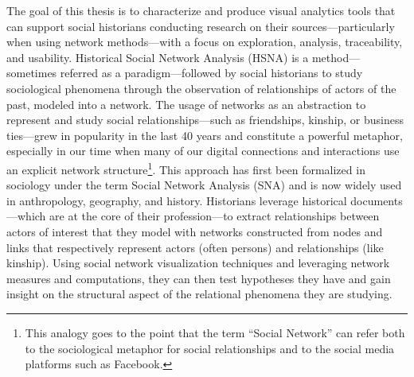 The goal of this thesis is to characterize and produce visual analytics tools that can support social historians conducting research on their sources---particularly when using network methods---with a focus on exploration, analysis, traceability, and usability.
Historical Social Network Analysis (HSNA) is a method---sometimes referred as a paradigm\cite{whiteNetworkAnalysisEthnographic2005}---followed by social historians to study sociological phenomena through the observation of relationships of actors of the past, modeled into a network.
The usage of networks as an abstraction to represent and study social relationships---such as friendships, kinship, or business ties---grew in popularity in the last 40 years \cite{freemanDevelopmentSocialNetwork2004, tabassumSocialNetworkAnalysis2018} and constitute a powerful metaphor, especially in our time when many of our digital connections and interactions use an explicit network structure\footnote{This analogy goes to the point that the term ``Social Network'' can refer both to the sociological metaphor for social relationships and to the social media platforms such as Facebook.}.
This approach has first been formalized in sociology under the term Social Network Analysis (SNA)\cite{freemanDevelopmentSocialNetwork2004} and is now widely used in anthropology\cite{millsSocialNetworkAnalysis2017}, geography\cite{beauguitteThéorieGraphesAnalyse2022}, and history\cite{kerschbaumerPowerNetworksProspects2015}.
Historians leverage historical documents---which are at the core of their profession\cite{langloisIntroductionAuxEtudes2014}---to extract relationships between actors of interest that they model with networks constructed from nodes and links that respectively represent actors (often persons) and relationships (like kinship).
Using social network visualization techniques and leveraging network measures and computations, they can then test hypotheses they have and gain insight on the structural aspect of the relational phenomena they are studying\cite{wetherellHistoricalSocialNetwork1998, kerschbaumerPowerNetworksProspects2015}.
